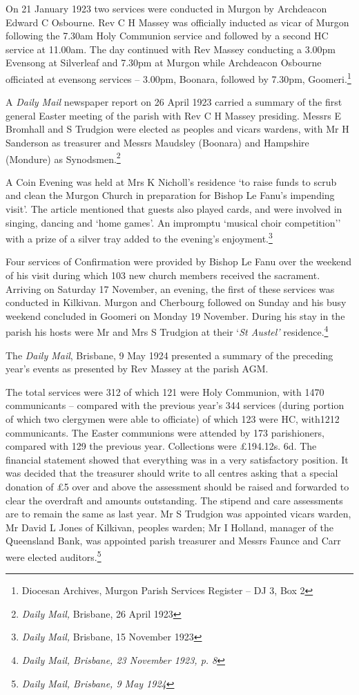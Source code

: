 On 21 January 1923 two services were conducted in Murgon by Archdeacon Edward C Osbourne. Rev C H Massey was officially inducted as vicar of Murgon following the 7.30am Holy Communion service and followed by a second HC service at 11.00am. The day continued with Rev Massey conducting a 3.00pm Evensong at Silverleaf and 7.30pm at Murgon while Archdeacon Osbourne officiated at evensong services -- 3.00pm, Boonara, followed by 7.30pm, Goomeri.\footnote{Diocesan Archives, Murgon Parish Services Register -- DJ 3, Box 2}

A \emph{Daily Mail} newspaper report on 26 April 1923 carried a summary of the first general Easter meeting of the parish with Rev C H Massey presiding. Messrs E Bromhall and S Trudgion were elected as peoples and vicars wardens, with Mr H Sanderson as treasurer and Messrs Maudsley (Boonara) and Hampshire (Mondure) as Synodsmen.\footnote{\emph{Daily Mail,} Brisbane, 26 April 1923}

A Coin Evening was held at Mrs K Nicholl's residence `to raise funds to scrub and clean the Murgon Church in preparation for Bishop Le Fanu's impending visit'. The article mentioned that guests also played cards, and were involved in singing, dancing and `home games'. An impromptu `musical choir competition'' with a prize of a silver tray added to the evening's enjoyment.\footnote{\emph{Daily Mail,} Brisbane, 15 November 1923}

Four services of Confirmation were provided by Bishop Le Fanu over the weekend of his visit during which 103 new church members received the sacrament. Arriving on Saturday 17 November, an evening, the first of these services was conducted in Kilkivan. Murgon and Cherbourg followed on Sunday and his busy weekend concluded in Goomeri on Monday 19 November. During his stay in the parish his hosts were Mr and Mrs S Trudgion at their `\emph{St Austel'} residence.\footnote{\emph{Daily Mail, Brisbane, 23 November 1923, p. 8}}

The \emph{Daily Mail}, Brisbane, 9 May 1924 presented a summary of the preceding year's events as presented by Rev Massey at the parish AGM.

The total services were 312 of which 121 were Holy Communion, with 1470 communicants -- compared with the previous year's 344 services (during portion of which two clergymen were able to officiate) of which 123 were HC, with1212 communicants. The Easter communions were attended by 173 parishioners, compared with 129 the previous year. Collections were £194.12s. 6d. The financial statement showed that everything was in a very satisfactory position. It was decided that the treasurer should write to all centres asking that a special donation of £5 over and above the assessment should be raised and forwarded to clear the overdraft and amounts outstanding. The stipend and care assessments are to remain the same as last year. Mr S Trudgion was appointed vicars warden, Mr David L Jones of Kilkivan, peoples warden; Mr I Holland, manager of the Queensland Bank, was appointed parish treasurer and Messrs Faunce and Carr were elected auditors.\footnote{\emph{Daily Mail, Brisbane, 9 May 1924}}

